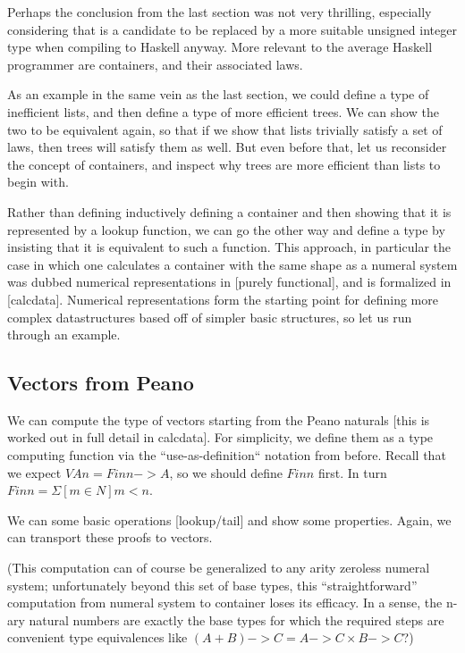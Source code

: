 \documentclass[Main.tex]{subfiles}
\begin{document}
Perhaps the conclusion from the last section was not very thrilling, especially considering that  is a candidate to be replaced by a more suitable unsigned integer type when compiling to Haskell anyway. More relevant to the average Haskell programmer are containers, and their associated laws.

As an example in the same vein as the last section, we could define a type of inefficient lists, and then define a type of more efficient trees. We can show the two to be equivalent again, so that if we show that lists trivially satisfy a set of laws, then trees will satisfy them as well. But even before that, let us reconsider the concept of containers, and inspect why trees are more efficient than lists to begin with.

Rather than defining inductively defining a container and then showing that it is represented by a lookup function, we can go the other way and define a type by insisting that it is equivalent to such a function. This approach, in particular the case in which one calculates a container with the same shape as a numeral system was dubbed numerical representations in [purely functional], and is formalized in [calcdata]. Numerical representations form the starting point for defining more complex datastructures based off of simpler basic structures, so let us run through an example.

\subsection{Vectors from Peano}
We can compute the type of vectors starting from the Peano naturals [this is worked out in full detail in calcdata]. For simplicity, we define them as a type computing function via the ``use-as-definition`` notation from before. Recall that we expect $V A n = Fin n -> A$, so we should define $Fin n$ first. In turn $Fin n = \Sigma[ m \in N ] m < n$.

\begin{comment}
Fin : \bN \to Type
Fin zero    = \Sigma[ m \in \bN ] m < zero = \Sigma[ m \in \bN ] \bot = \bot
Fin (suc n) = \Sigma[ m \in \bN ] m < suc n = 0 < suc n + \Sigma[m \in \bN] suc m < suc n = \top + Fin n 

Vec : Type \to \bN \to Type
Vec A zero    = Fin zero -> A
Vec A (suc n) = Fin (suc n) -> A = \top + Fin n -> A = A \times Fin n \to A = A \times Vec A n
\end{comment}

We can some basic operations [lookup/tail] and show some properties. Again, we can transport these proofs to vectors.

(This computation can of course be generalized to any arity zeroless numeral system; unfortunately beyond this set of base types, this ``straightforward'' computation from numeral system to container loses its efficacy. In a sense, the n-ary natural numbers are exactly the base types for which the required steps are convenient type equivalences like $(A + B) -> C = A -> C \times B -> C$?)
\end{document}
